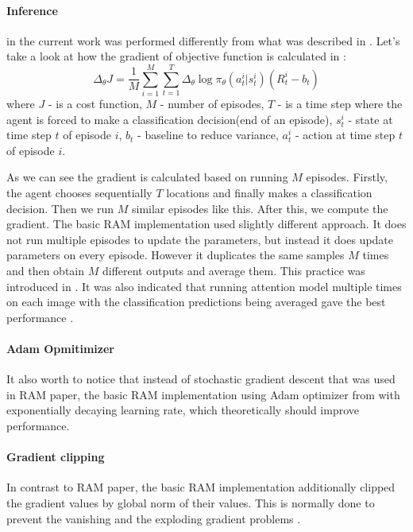 \paragraph{Inference} in the current work was performed differently from what was
described in \cite{DBLP:journals/corr/MnihHGK14}.
Let's take a look at how the gradient of objective function is calculated in \cite{DBLP:journals/corr/MnihHGK14}:
\begin{equation} \label{eq:}
	\Delta_{\theta} J = \frac{1}{M} \sum_{i=1}^M \sum_{t=1}^T
		\Delta_{\theta} \log \pi_{\theta}(a_t^i| s_t^i) (R_t^i - b_t)
\end{equation}
where $J$ - is a cost function, $M$ - number of episodes,
$T$ - is a time step where the agent is forced to make a classification decision(end of an episode),
$s_t^i$ - state at time step $t$ of episode $i$,
$b_t$ - baseline to reduce variance, $a_t^i$ - action at time step $t$
of episode $i$.

As we can see the gradient is calculated based on running $M$ episodes.
Firstly, the agent chooses sequentially $T$ locations and finally makes a classification
decision. Then we run $M$ similar episodes like this. After this,
we compute the gradient. The basic RAM implementation used slightly different
approach. It does not run multiple episodes to update the parameters, but instead
it does update parameters on every episode. However it duplicates the same
samples $M$ times and then obtain $M$ different outputs and average them.
This practice was introduced in \cite{DBLP:journals/corr/BaMK14}.
It was also indicated that running attention model multiple times on each
image with the classification predictions being averaged gave the best
performance \cite{DBLP:journals/corr/BaMK14}.


\paragraph{Adam Opmitimizer} It also worth to notice that instead of stochastic
gradient descent that was used in RAM paper, the basic RAM implementation using Adam optimizer
from \cite{DBLP:journals/corr/KingmaB14} with exponentially decaying learning rate,
which theoretically should improve performance. \cite{DBLP:journals/corr/KingmaB14}


\paragraph{Gradient clipping} In contrast to RAM paper, the basic RAM implementation
additionally clipped the gradient values by global norm of their values.
This is normally done to prevent the vanishing
and the exploding gradient problems \cite{Pascanu2012}.


